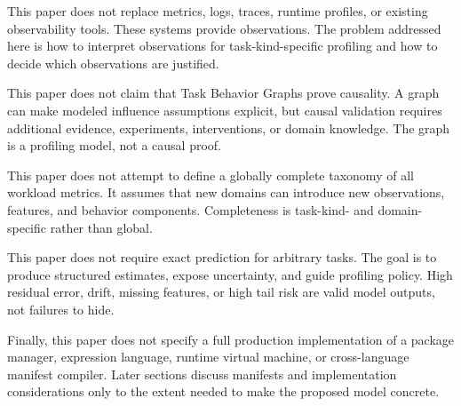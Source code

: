 This paper does not replace metrics, logs, traces, runtime profiles, or existing
observability tools. These systems provide observations. The problem addressed
here is how to interpret observations for task-kind-specific profiling and how
to decide which observations are justified.

This paper does not claim that Task Behavior Graphs prove causality. A graph can
make modeled influence assumptions explicit, but causal validation requires
additional evidence, experiments, interventions, or domain knowledge. The graph
is a profiling model, not a causal proof.

This paper does not attempt to define a globally complete taxonomy of all
workload metrics. It assumes that new domains can introduce new observations,
features, and behavior components. Completeness is task-kind- and
domain-specific rather than global.

This paper does not require exact prediction for arbitrary tasks. The goal is to
produce structured estimates, expose uncertainty, and guide profiling policy.
High residual error, drift, missing features, or high tail risk are valid model
outputs, not failures to hide.

Finally, this paper does not specify a full production implementation of a
package manager, expression language, runtime virtual machine, or cross-language
manifest compiler. Later sections discuss manifests and implementation
considerations only to the extent needed to make the proposed model concrete.
